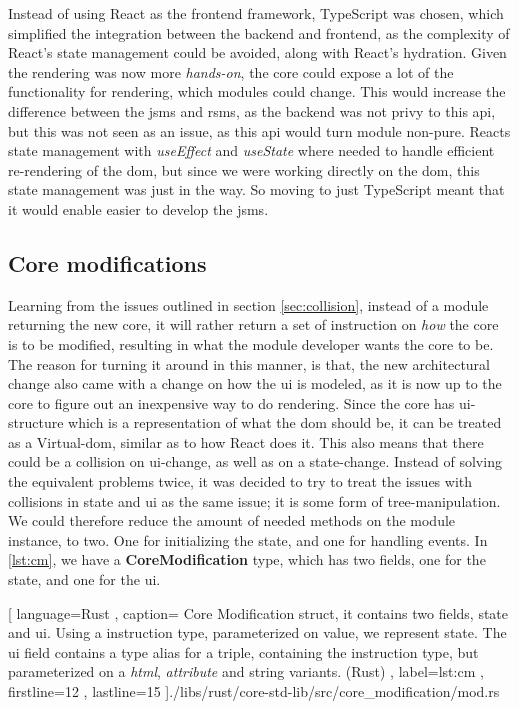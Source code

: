 Instead of using React as the frontend framework, TypeScript was chosen, which
simplified the integration between the backend and frontend, as the complexity
of React's state management could be avoided, along with React's hydration.
Given the rendering was now more \textit{hands-on}, the core could expose a lot
of the functionality for rendering, which modules could change. This would
increase the difference between the \gls*{jsms} and \gls*{rsms}, as the backend
was not privy to this \gls*{api}, but this was not seen as an issue, as this
\gls*{api} would turn module non-pure. Reacts state management with
\textit{useEffect} and \textit{useState} where needed to handle efficient
re-rendering of the \gls{dom}, but since we were working directly on the
\gls{dom}, this state management was just in the way. So moving to just
TypeScript meant that it would enable easier to develop the \gls*{jsms}.


\subsection{Core modifications}

Learning from the issues outlined in section \ref{sec:collision}, instead of a
module returning the new core, it will rather return a set of instruction on
\textit{how} the core is to be modified, resulting in what the module developer
wants the core to be. The reason for turning it around in this manner, is that,
the new architectural change also came with a change on how the \gls*{ui} is
modeled, as it is now up to the core to figure out an inexpensive way to do
rendering. Since the core has \gls*{ui}-structure which is a representation of
what the \gls*{dom} should be, it can be treated as a Virtual-\gls*{dom}, similar
as to how React does it. This also means that there could be a collision on
\gls*{ui}-change, as well as on a state-change. Instead of solving the equivalent
problems twice, it was decided to try to treat the issues with collisions in
state and \gls*{ui} as the same issue; it is some form of tree-manipulation. We
could therefore reduce the amount of needed methods on the module instance, to
two. One for initializing the state, and one for handling events. In
\ref{lst:cm}, we have a \textbf{CoreModification} type, which has two fields,
one for the state, and one for the \gls*{ui}.

\begin{center}
  
    [ language=Rust
    , caption={
      Core Modification struct, it contains two fields, state and ui. Using a
      instruction type, parameterized on value, we represent state. The ui field
      contains a type alias for a triple, containing the instruction type, but
      parameterized on a \textit{html}, \textit{attribute} and string variants.
      (Rust)
    }
    , label=lst:cm
    , firstline=12
    , lastline=15
    ]{./libs/rust/core-std-lib/src/core_modification/mod.rs}
\end{center}


